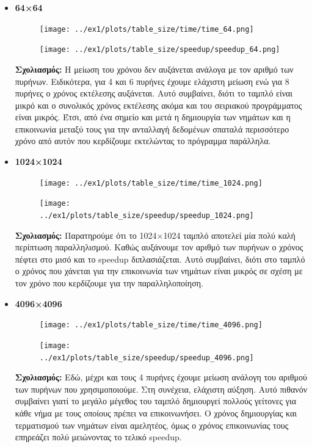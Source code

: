 \documentclass{article}
\begin{document}
\begin{itemize}
\item \textbf{64×64}

\begin{figure}[H]
  \centering
    \texttt{[image: ../ex1/plots/table\_size/time/time\_64.png]}
\end{figure}

\begin{figure}[H]
  \centering
    \texttt{[image: ../ex1/plots/table\_size/speedup/speedup\_64.png]}
\end{figure}


\textbf{Σχολιασμός:}
Η μείωση του χρόνου δεν αυξάνεται ανάλογα με τον αριθμό των πυρήνων. Ειδικότερα, για 4 και 6 πυρήνες έχουμε ελάχιστη μείωση ενώ για 8 πυρήνες ο χρόνος εκτέλεσης αυξάνεται. Αυτό συμβαίνει, διότι το ταμπλό είναι μικρό και ο συνολικός χρόνος εκτέλεσης ακόμα και του σειριακού προγράμματος είναι μικρός. Έτσι, από ένα σημείο και μετά η δημιουργία των νημάτων και η επικοινωνία μεταξύ τους για την ανταλλαγή δεδομένων σπαταλά περισσότερο χρόνο από αυτόν που κερδίζουμε εκτελώντας το πρόγραμμα παράλληλα.


\item \textbf{1024×1024}

\begin{figure}[H]
  \centering
    \texttt{[image: ../ex1/plots/table\_size/time/time\_1024.png]}
\end{figure}

\begin{figure}[H]
  \centering
    \texttt{[image: ../ex1/plots/table\_size/speedup/speedup\_1024.png]}
\end{figure}

\textbf{Σχολιασμός:} Παρατηρούμε ότι το 1024×1024 ταμπλό αποτελεί μία πολύ καλή περίπτωση παραλληλισμού. Καθώς αυξάνουμε τον αριθμό των πυρήνων ο χρόνος πέφτει στο μισό και το speedup διπλασιάζεται. Αυτό συμβαίνει, διότι στο ταμπλό ο χρόνος που χάνεται για την επικοινωνία των νημάτων είναι μικρός σε σχέση με τον χρόνο που κερδίζουμε για την παραλληλοποίηση.

\pagebreak

\item \textbf{4096×4096}

\begin{figure}[H]
  \centering
    \texttt{[image: ../ex1/plots/table\_size/time/time\_4096.png]}
\end{figure}


\begin{figure}[H]
  \centering
    \texttt{[image: ../ex1/plots/table\_size/speedup/speedup\_4096.png]}
\end{figure}

\textbf{Σχολιασμός:}
Εδώ, μέχρι και τους 4 πυρήνες έχουμε μείωση ανάλογη του αριθμού των πυρήνων που χρησιμοποιούμε. Στη συνέχεια, ελάχιστη αύξηση. Αυτό πιθανόν συμβαίνει γιατί το μεγάλο μέγεθος του ταμπλό δημιουργεί πολλούς γείτονες για κάθε νήμα με τους οποίους πρέπει να επικοινωνήσει. Ο χρόνος δημιουργίας και τερματισμού των νημάτων είναι αμελητέος, όμως ο χρόνος επικοινωνίας τους επηρεάζει πολύ μειώνοντας το τελικό speedup.

\end{itemize}
\end{document}
